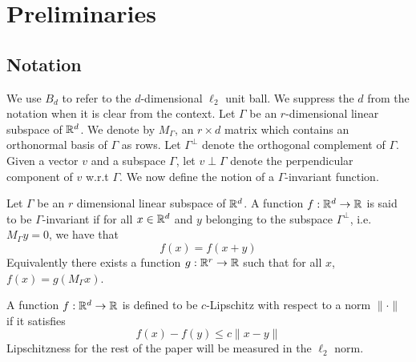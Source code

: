 \documentclass[final,12pt]{colt2018} %
\begin{document}
\section{Preliminaries}
\label{sec:prelimssmooth}
\subsection{Notation}

We use $B_d$ to refer to the $d$-dimensional $\ell_2$ unit ball. We suppress the $d$ from the notation when it is clear from the context. Let $\Gamma$ be an $r$-dimensional linear subspace of ${\mathbb R}^d$. We denote by $M_{\Gamma}$, an $r \times d$ matrix which contains an orthonormal basis of $\Gamma$ as rows. Let $\Gamma^{\perp}$ denote the orthogonal complement of $\Gamma$. Given a vector $v$ and a subspace $\Gamma$, let $v \perp \Gamma$ denote the perpendicular component of $v$ w.r.t $\Gamma$. We now define the notion of a $\Gamma$-invariant function. 

\begin{definition}
\label{defn:gammainvariance}
Let $\Gamma$ be an $r$ dimensional linear subspace of ${\mathbb R}^d$. A function $f:{\mathbb R}^d \rightarrow {\mathbb R}$ is said to be $\Gamma$-invariant if for all $x \in {\mathbb R}^d$ and $y$ belonging to the subspace $\Gamma^{\perp}$, i.e. $M_{\Gamma} y = 0$, we have that
    \[ f(x) = f(x + y)\]
   Equivalently there exists a function $g:{\mathbb R}^r \rightarrow {\mathbb R}$ such that for all $x$, $f(x) = g(M_{\Gamma} x)$.
\end{definition}
\noindent A function $f: {\mathbb R}^d \rightarrow {\mathbb R}$ is defined to be $c$-Lipschitz with respect to a norm $\|\cdot\|$ if it satisfies
\[ f(x) - f(y) \leq c\|x-y\| \] 
 Lipschitzness for the rest of the paper will be measured in the $\ell_2$ norm. 
\end{document}
